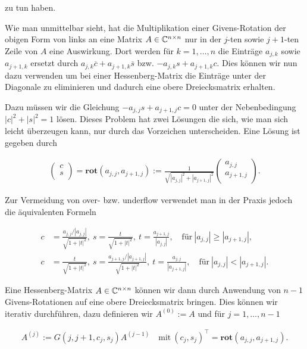 \documentclass{article}
\begin{document}
zu tun haben.

Wie man unmittelbar sieht, hat die Multiplikation einer Givens-Rotation der obigen Form von links an eine Matrix $A\in \mathbb{C}^{n\times n}$ nur in der $j$-ten sowie $j+1$-ten Zeile von $A$ eine Auswirkung. Dort werden für $k = 1,\dots, n$ die Einträge $a_{j,k}$ sowie $a_{j+1, k}$ ersetzt durch $a_{j,k}\overline{c} + a_{j+1, k}\overline{s}$ bzw. $-a_{j,k}s + a_{j+1, k}c$. Dies können wir nun dazu verwenden um bei einer Hessenberg-Matrix die Einträge unter der Diagonale zu eliminieren und dadurch eine obere Dreiecksmatrix erhalten.

Dazu müssen wir die Gleichung $-a_{j,j}s + a_{j+1, j}c = 0$ unter der Nebenbedingung $|c|^2 + |s|^2 = 1$ lösen. Dieses Problem hat zwei Lösungen die sich, wie man sich leicht überzeugen kann, nur durch das Vorzeichen unterscheiden. Eine Lösung ist gegeben durch

\begin{align*}
\left(\begin{array}{c}
    c \\
    s \\
\end{array}\right)
=
\textbf{rot}(a_{j,j},a_{j+1,j})
:=
\frac{1}{\sqrt{|a_{j,j}|^2 + |a_{j+1,j}|^2}}
\left(\begin{array}{c}
a_{j,j} \\
a_{j+1,j} \\
\end{array}\right).
\end{align*}

Zur Vermeidung von over- bzw. underflow verwendet man in der Praxis jedoch die äquivalenten Formeln

\begin{align*}
	c &= \frac{a_{j,j} / |a_{j,j}|}{\sqrt{1+|t|^2}},~
	s = \frac{t}{\sqrt{1 +|t|^2}},~
	t = \frac{a_{j+1,j}}{|a_{j,j}|}, \quad
	\text{für}~ |a_{j,j}| \geq |a_{j+1,j}|, \\
	c &= \frac{t}{\sqrt{1 +|t|^2}},~
	s = \frac{a_{j+1,j} / |a_{j+1,j}|}{\sqrt{1+|t|^2}},~
	t = \frac{a_{j,j}}{|a_{j+1,j}|}, \quad
	\text{für}~ |a_{j,j}| < |a_{j+1,j}|.
\end{align*}

Eine Hessenberg-Matrix $A \in \mathbb{C}^{n\times n}$ können wir dann durch Anwendung von $n-1$ Givens-Rotationen auf eine obere Dreiecksmatrix bringen. Dies können wir iterativ durchführen, dazu definieren wir $A^{(0)} := A$ und für $j = 1,\dots, n-1$

\begin{align*}
	A^{(j)} :=
	G(j, j+1, c_j, s_j)A^{(j-1)} \quad
	\text{mit}~
	(c_j, s_j)^\top  = \textbf{rot}(a_{j,j},a_{j+1,j}).
\end{align*}
\end{document}
